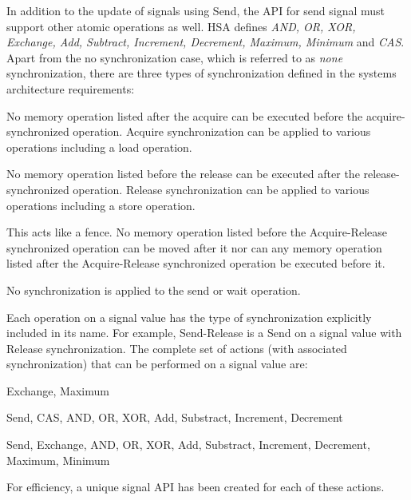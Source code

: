 \documentclass{book}
\begin{document}
In addition to the update of signals using
Send, the API for send signal must support other atomic operations as
well. HSA defines \emph {AND, OR, XOR, Exchange, Add, Subtract,
Increment, Decrement, Maximum, Minimum} and \emph{CAS}. Apart from
the no synchronization case, which is referred to as \emph{none}
synchronization, there are three types of synchronization defined in
the systems architecture requirements:

\begin{description}[font=\it, leftmargin=1.5em]
\item[Acquire synchronization]
  No memory operation listed after the acquire can be
  executed before the acquire-synchronized operation. Acquire
  synchronization can be applied to various operations
  including a load operation.
\item[Release synchronization]
  No memory operation listed before the release can be
  executed after the release-synchronized operation. Release
  synchronization can be applied to various operations
  including a store operation.
\item[Acquire-Release synchronization]
  This acts like a fence. No memory operation listed
  before the Acquire-Release synchronized operation
  can be moved after it nor can any memory operation
  listed after the Acquire-Release synchronized
  operation be executed before it.
\item[Relaxed synchronization]
  No synchronization is applied to the send or wait
  operation.
\end{description}

Each operation on a signal value has the type of synchronization
explicitly included in its name. For example, Send-Release is a Send
on a signal value with Release synchronization. The complete set of
actions (with associated synchronization) that can be performed on a
signal value are:
\begin{description}[font=\it, leftmargin=1.5em]
\item[Acquire-Release synchronization] Exchange, Maximum
\item[Release synchronization] Send, CAS, AND, OR, XOR, Add, Substract, Increment, Decrement
\item[Relaxed synchronization] Send, Exchange, AND, OR, XOR, Add, Substract, Increment, Decrement, Maximum, Minimum
\end{description}
For efficiency, a unique signal API has been created for each of
these actions.

\makeatletter{}
\end{document}
